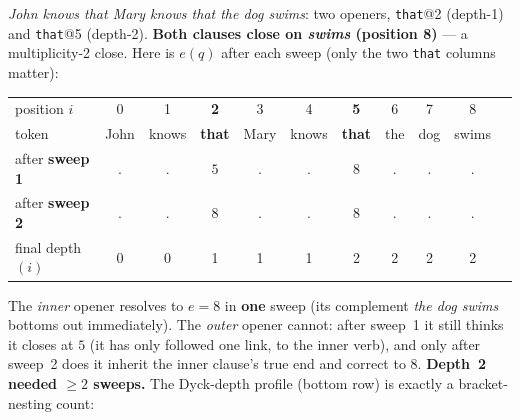 \documentclass[11pt]{article}
\newcommand{\head}[1]{\textcolor{headc}{#1}}
\newcommand{\flip}[1]{\textcolor{flipc}{#1}}
\newcommand{\code}[1]{\texttt{#1}}
\begin{document}
\emph{John knows that Mary knows that the dog swims}: two openers, \code{that}@2 (depth-1) and
\code{that}@5 (depth-2). \textbf{Both clauses close on \emph{swims} (position 8)} --- a
multiplicity-2 close. Here is $e(q)$ after each sweep (only the two \code{that} columns matter):

\begin{center}\small
\begin{tabular}{@{}l cccccccccc@{}}
\toprule
position $i$        & 0 & 1 & \textbf{2} & 3 & 4 & \textbf{5} & 6 & 7 & 8 \\
token               & John & knows & \textbf{that} & Mary & knows & \textbf{that} & the & dog & swims\\
\midrule
after \textbf{sweep 1} & . & . & \flip{$5$} & . & . & $8$ & . & . & . \\
after \textbf{sweep 2} & . & . & \head{$8$} & . & . & $8$ & . & . & . \\
final depth$(i)$    & 0 & 0 & 1 & 1 & 1 & 2 & 2 & 2 & 2 \\
\bottomrule
\end{tabular}
\end{center}

\noindent The \emph{inner} opener resolves to $e=8$ in \textbf{one} sweep (its complement
\emph{the dog swims} bottoms out immediately). The \emph{outer} opener cannot: after sweep~1 it
still thinks it closes at \flip{$5$} (it has only followed one link, to the inner verb), and only
after sweep~2 does it inherit the inner clause's true end and correct to \head{$8$}. \textbf{Depth~2
needed $\ge 2$ sweeps.} The Dyck-depth profile (bottom row) is exactly a bracket-nesting count:

\begin{center}
\end{center}
\end{document}
